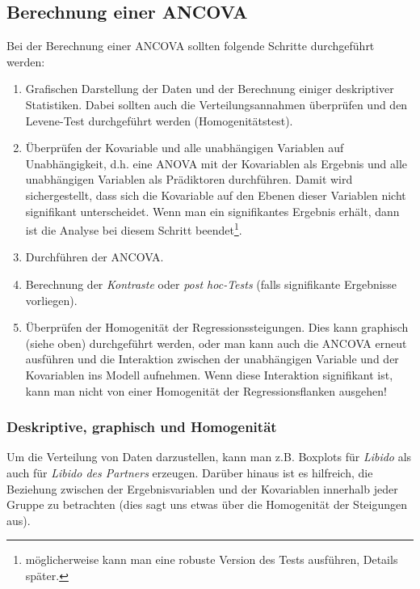 \documentclass[]{article}
\providecommand{\tightlist}{%
  \setlength{\itemsep}{0pt}\setlength{\parskip}{0pt}}
\let\rmarkdownfootnote\footnote%
\def\footnote{\protect\rmarkdownfootnote}
\begin{document}
\subsection*{Berechnung einer ANCOVA}\label{berechnung-einer-ancova}

Bei der Berechnung einer ANCOVA sollten folgende Schritte durchgeführt
werden:

\begin{enumerate}
\def\labelenumi{\arabic{enumi}.}
\tightlist
\item
  Grafischen Darstellung der Daten und der Berechnung einiger
  deskriptiver Statistiken. Dabei sollten auch die Verteilungsannahmen
  überprüfen und den Levene-Test durchgeführt werden (Homogenitätstest).
\item
  Überprüfen der Kovariable und alle unabhängigen Variablen auf
  Unabhängigkeit, d.h. eine ANOVA mit der Kovariablen als Ergebnis und
  alle unabhängigen Variablen als Prädiktoren durchführen. Damit wird
  sichergestellt, dass sich die Kovariable auf den Ebenen dieser
  Variablen nicht signifikant unterscheidet. Wenn man ein signifikantes
  Ergebnis erhält, dann ist die Analyse bei diesem Schritt
  beendet\footnote{möglicherweise kann man eine robuste Version des
    Tests ausführen, Details später.}.
\item
  Durchführen der ANCOVA.
\item
  Berechnung der \emph{Kontraste} oder \emph{post hoc-Tests} (falls
  signifikante Ergebnisse vorliegen).
\item
  Überprüfen der Homogenität der Regressionssteigungen. Dies kann
  graphisch (siehe oben) durchgeführt werden, oder man kann auch die
  ANCOVA erneut ausführen und die Interaktion zwischen der unabhängigen
  Variable und der Kovariablen ins Modell aufnehmen. Wenn diese
  Interaktion signifikant ist, kann man nicht von einer Homogenität der
  Regressionsflanken ausgehen!
\end{enumerate}

\subsubsection*{Deskriptive, graphisch und
Homogenität}\label{deskriptive-graphisch-und-homogenitat}

Um die Verteilung von Daten darzustellen, kann man z.B. Boxplots für
\emph{Libido} als auch für \emph{Libido des Partners} erzeugen. Darüber
hinaus ist es hilfreich, die Beziehung zwischen der Ergebnisvariablen
und der Kovariablen innerhalb jeder Gruppe zu betrachten (dies sagt uns
etwas über die Homogenität der Steigungen aus).
\end{document}
